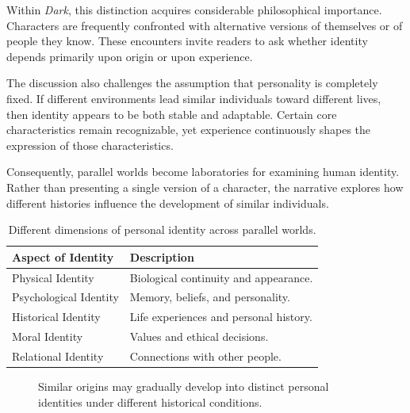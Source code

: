 \documentclass[12pt,oneside,openany]{book}
\begin{document}
Within \textit{Dark}, this distinction acquires considerable philosophical
importance. Characters are frequently confronted with alternative versions of
themselves or of people they know. These encounters invite readers to ask
whether identity depends primarily upon origin or upon experience.

The discussion also challenges the assumption that personality is completely
fixed. If different environments lead similar individuals toward different
lives, then identity appears to be both stable and adaptable. Certain core
characteristics remain recognizable, yet experience continuously shapes the
expression of those characteristics.

Consequently, parallel worlds become laboratories for examining human identity.
Rather than presenting a single version of a character, the narrative explores
how different histories influence the development of similar individuals.

\begin{table}[H]
\centering
\begin{tabular}{|p{4.3cm}|p{7.7cm}|}
\hline
\textbf{Aspect of Identity} & \textbf{Description}\\
\hline
Physical Identity & Biological continuity and appearance.\\
\hline
Psychological Identity & Memory, beliefs, and personality.\\
\hline
Historical Identity & Life experiences and personal history.\\
\hline
Moral Identity & Values and ethical decisions.\\
\hline
Relational Identity & Connections with other people.\\
\hline
\end{tabular}
\caption{Different dimensions of personal identity across parallel worlds.}
\end{table}

\begin{figure}[H]
\centering
{}

\caption{Similar origins may gradually develop into distinct personal identities under different historical conditions.}
\end{figure}
\end{document}
